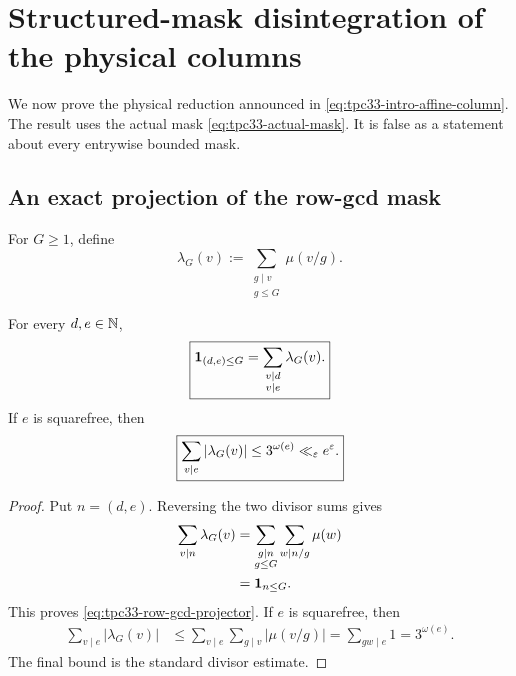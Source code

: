 \section{Structured-mask disintegration of the physical columns}
\label{sec:tpc33-structured-mask}

We now prove the physical reduction announced in
\eqref{eq:tpc33-intro-affine-column}.  The result uses the actual mask
\eqref{eq:tpc33-actual-mask}.  It is false as a statement about every
entrywise bounded mask.

\subsection{An exact projection of the row-gcd mask}

For \(G\ge1\), define
\begin{equation}
 \lambda_G(v)
 :=\sum_{\substack{g\mid v\\g\le G}}\mu(v/g).
 \label{eq:tpc33-truncated-gcd-coefficient}
\end{equation}

\begin{lemma}
\label{lem:tpc33-row-gcd-projector}
For every \(d,e\in\mathbb N\),
\begin{equation}
 \boxed{
 \mathbf 1_{(d,e)\le G}
 =\sum_{\substack{v\mid d\\v\mid e}}\lambda_G(v).}
 \label{eq:tpc33-row-gcd-projector}
\end{equation}
If \(e\) is squarefree, then
\begin{equation}
 \boxed{
 \sum_{v\mid e}|\lambda_G(v)|
 \le3^{\omega(e)}\ll_\varepsilon e^\varepsilon.}
 \label{eq:tpc33-row-gcd-projector-mass}
\end{equation}
\end{lemma}

\begin{proof}
Put \(n=(d,e)\).  Reversing the two divisor sums gives
\begin{align*}
 \sum_{v\mid n}\lambda_G(v)
 &=\sum_{\substack{g\mid n\\g\le G}}
   \sum_{w\mid n/g}\mu(w)\\
 &=\mathbf 1_{n\le G}.
\end{align*}
This proves \eqref{eq:tpc33-row-gcd-projector}.  If \(e\) is squarefree,
then
\begin{align*}
 \sum_{v\mid e}|\lambda_G(v)|
 &\le\sum_{v\mid e}\sum_{g\mid v}|\mu(v/g)|
 =\sum_{gw\mid e}1=3^{\omega(e)}.
\end{align*}
The final bound is the standard divisor estimate.
\end{proof}

